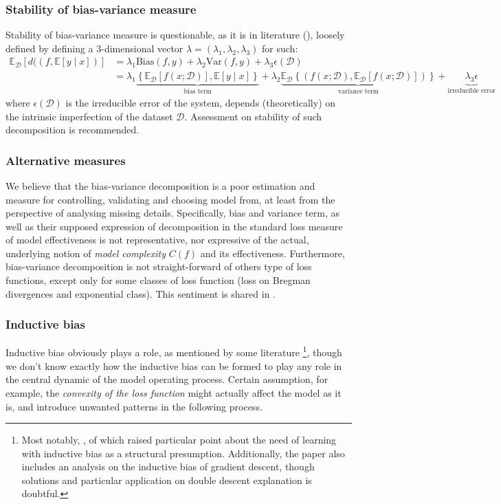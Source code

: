 \subsubsection{Stability of bias-variance measure}
Stability of bias-variance measure is questionable, as it is in literature (\cite{domingos_unifeid_2000}), loosely defined by defining a 3-dimensional vector $\lambda=(\lambda_{1},\lambda_{2},\lambda_{3})$ for such: 
\noindent 
\begin{equation*}
        \begin{split}
            \mathbb{E}_{\mathcal{D}} \left[d((f,\mathbb{E}[y\mid x])\right] & = \lambda_{1} \mathrm{Bias}(f,y) + \lambda_{2}\mathrm{Var}(f,y)+ \lambda_{3}\epsilon(\mathcal{D})\\ 
            & = \lambda_{1}\underbrace{\left\{ \mathbb{E}_{\mathcal{D}}[f(x;\mathcal{D})] , \mathbb{E}[y\mid x] \right\}}_{\text{bias term}} +\lambda_{2} \underbrace{\mathbb{E}_{\mathcal{D}} \left\{(f(x;\mathcal{D}), \mathbb{E}_{\mathcal{D}}[f(x;\mathcal{D})])\right\}}_{\text{variance term}} +\underbrace{\lambda_{3}\epsilon}_{\text{irreducible error}}
        \end{split}
\end{equation*}
where $\epsilon(\mathcal{D})$ is the irreducible error of the system, depends (theoretically) on the intrinsic imperfection of the dataset $\mathcal{D}$. Assessment on stability of such decomposition is recommended. 
\subsubsection{Alternative measures}
We believe that the bias-variance decomposition is a poor estimation and measure for controlling, validating and choosing model from, at least from the perspective of analysing missing details. Specifically, bias and variance term, as well as their supposed expression of decomposition in the standard loss measure of model effectiveness is not representative, nor expressive of the actual, underlying notion of \textit{model complexity} $C(f)$ and its effectiveness. Furthermore, bias-variance decomposition is not straight-forward of others type of loss functions, except only for some classes of loss function (loss on Bregman divergences and exponential class). This sentiment is shared in \cite{brown2024biasvariance}.

\subsubsection{Inductive bias}
Inductive bias obviously plays a role, as mentioned by some literature \footnote{Most notably, \cite{lafon_understanding_2024}, of which raised particular point about the need of learning with inductive bias as a structural presumption. Additionally, the paper also includes an analysis on the inductive bias of gradient descent, though solutions and particular application on double descent explanation is doubtful.}, though we don't know exactly how the inductive bias can be formed to play any role in the central dynamic of the model operating process. Certain assumption, for example, the \textit{convexity of the loss function} might actually affect the model as it is, and introduce unwanted patterns in the following process. 
